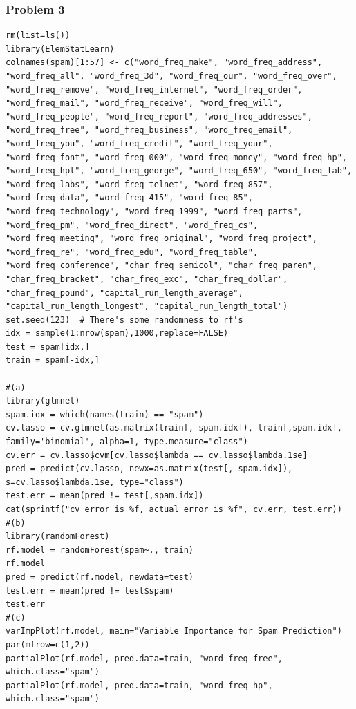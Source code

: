 \documentclass[12pt]{article}
\begin{document}
\subsubsection*{Problem 3}
\begin{lstlisting}
rm(list=ls())
library(ElemStatLearn)
colnames(spam)[1:57] <- c("word_freq_make", "word_freq_address", "word_freq_all", "word_freq_3d", "word_freq_our", "word_freq_over", "word_freq_remove", "word_freq_internet", "word_freq_order", "word_freq_mail", "word_freq_receive", "word_freq_will", "word_freq_people", "word_freq_report", "word_freq_addresses", "word_freq_free", "word_freq_business", "word_freq_email", "word_freq_you", "word_freq_credit", "word_freq_your", "word_freq_font", "word_freq_000", "word_freq_money", "word_freq_hp", "word_freq_hpl", "word_freq_george", "word_freq_650", "word_freq_lab", "word_freq_labs", "word_freq_telnet", "word_freq_857", "word_freq_data", "word_freq_415", "word_freq_85", "word_freq_technology", "word_freq_1999", "word_freq_parts", "word_freq_pm", "word_freq_direct", "word_freq_cs", "word_freq_meeting", "word_freq_original", "word_freq_project", "word_freq_re", "word_freq_edu", "word_freq_table", "word_freq_conference", "char_freq_semicol", "char_freq_paren", "char_freq_bracket", "char_freq_exc", "char_freq_dollar", "char_freq_pound", "capital_run_length_average", "capital_run_length_longest", "capital_run_length_total")
set.seed(123)  # There's some randomness to rf's
idx = sample(1:nrow(spam),1000,replace=FALSE)
test = spam[idx,]
train = spam[-idx,]

#(a)
library(glmnet)
spam.idx = which(names(train) == "spam")
cv.lasso = cv.glmnet(as.matrix(train[,-spam.idx]), train[,spam.idx], family='binomial', alpha=1, type.measure="class")
cv.err = cv.lasso$cvm[cv.lasso$lambda == cv.lasso$lambda.1se]
pred = predict(cv.lasso, newx=as.matrix(test[,-spam.idx]), s=cv.lasso$lambda.1se, type="class")
test.err = mean(pred != test[,spam.idx])
cat(sprintf("cv error is %f, actual error is %f", cv.err, test.err))
#(b)
library(randomForest)
rf.model = randomForest(spam~., train)
rf.model
pred = predict(rf.model, newdata=test)
test.err = mean(pred != test$spam)
test.err
#(c)
varImpPlot(rf.model, main="Variable Importance for Spam Prediction")
par(mfrow=c(1,2))
partialPlot(rf.model, pred.data=train, "word_freq_free", which.class="spam")
partialPlot(rf.model, pred.data=train, "word_freq_hp", which.class="spam")
\end{lstlisting}


%
%
\end{document}
